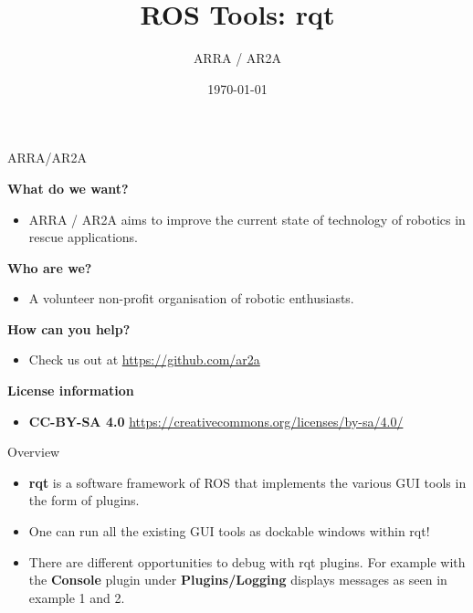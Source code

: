 \documentclass{beamer}
\title[]{ROS Tools: rqt} %
\author{ARRA / AR2A} %
\institute %
{
\textbf{A}dvancements for \textbf{R}obotics in \textbf{R}escue \textbf{A}pplications
}
\date{\today} %
\begin{document}
\begin{frame}
\titlepage %
\end{frame}
\begin{frame}{ARRA/AR2A}
\begin{large}\textbf{What do we want?}\end{large}
\begin{itemize}
 \item ARRA / AR2A aims to improve the current state of technology of robotics in rescue applications.
\end{itemize}
\begin{large}\textbf{Who are we?}\end{large}
\begin{itemize}
 \item A volunteer non-profit organisation of robotic enthusiasts.
\end{itemize}
\begin{large}\textbf{How can you help?}\end{large}
\begin{itemize}
 \item Check us out at \url{https://github.com/ar2a}
\end{itemize}
 \vspace{1cm}
\begin{large}\textbf{License information}\end{large}
\begin{itemize}
 \item \textbf{CC-BY-SA 4.0} \url{https://creativecommons.org/licenses/by-sa/4.0/}
\end{itemize}
\end{frame}
\begin{frame}{Overview}
\begin{itemize}
 \item 	\textbf{rqt} is a software framework of ROS that implements the various GUI tools in the form of plugins.
\end{itemize}
\begin{itemize}
 \item One can run all the existing GUI tools as dockable windows within rqt!
\end{itemize}
\begin{itemize}
 \item There are different opportunities to debug with rqt plugins. For example with the \textbf{Console} plugin under \textbf{Plugins/Logging} displays messages as seen in example 1 and 2.
\end{itemize}
\end{frame}
\end{document}
